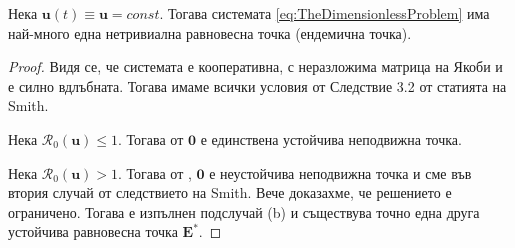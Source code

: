 \begin{proposition}
  Нека $\mathbf{u}(t)\equiv \mathbf{u}=const$. Тогава системата \ref{eq:TheDimensionlessProblem} има най-много една нетривиална равновесна точка (ендемична точка).
\end{proposition}

\begin{proof}
  Видя се, че системата е кооперативна, с неразложима матрица на Якоби и е силно вдлъбната. Тогава имаме всички условия от Следствие 3.2 от статията \cite{Smith1986} на Smith.

  Нека $\mathscr{R}_0(\mathbf{u}) \leq 1$. Тогава от \cite{Driessche2002} $\mathbf{0}$ е единствена устойчива неподвижна точка.

  Нека $\mathscr{R}_0(\mathbf{u}) > 1$. Тогава от \cite{Driessche2002}, $\mathbf{0}$ е неустойчива неподвижна точка и сме във втория случай от следствието на Smith. Вече доказахме, че решението е ограничено. Тогава е изпълнен подслучай (b) и съществува точно една друга устойчива равновесна точка $\mathbf{E}^*$.

\end{proof}


